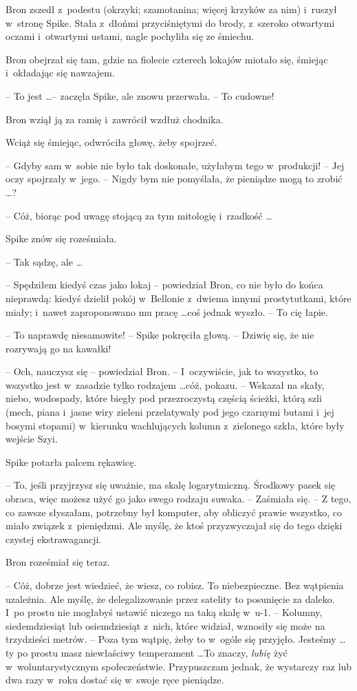 \documentclass[oneside,polish,11pt,rmheadings]{mwbk}
\begin{document}
Bron zszedł z~podestu (okrzyki; szamotanina; więcej krzyków za nim) i~ruszył w~stronę Spike. Stała z~dłońmi przyciśniętymi do brody, z~szeroko otwartymi oczami i~otwartymi ustami, nagle pochyliła się ze śmiechu. 

Bron obejrzał się tam, gdzie na fiolecie czterech lokajów miotało się, śmiejąc i~okładając się nawzajem. 

-- To jest \ldots  -- zaczęła Spike, ale znowu przerwała. -- To cudowne! 

Bron wziął ją za ramię i~zawrócił wzdłuż chodnika. 

Wciąż się śmiejąc, odwróciła głowę, żeby spojrzeć.

-- Gdyby sam w~sobie nie było tak doskonałe, użyłabym tego w~produkcji! -- Jej oczy spojrzały w~jego. -- Nigdy bym nie pomyślała, że pieniądze mogą to zrobić \ldots ? 

-- Cóż, biorąc pod uwagę stojącą za tym mitologię i~rzadkość \ldots  

Spike znów się roześmiała. 

-- Tak sądzę, ale \ldots  

-- Spędziłem kiedyś czas jako lokaj -- powiedział Bron, co nie było do końca nieprawdą: kiedyś dzielił pokój w~Bellonie z~dwiema innymi prostytutkami, które miały; i~nawet zaproponowano mu pracę \ldots  coś jednak wyszło. -- To cię łapie. 

-- To naprawdę niesamowite! -- Spike pokręciła głową. -- Dziwię się, że nie rozrywają go na kawałki! 

-- Och, nauczysz się -- powiedział Bron. -- I~oczywiście, jak to wszystko, to wszystko jest w~zasadzie tylko rodzajem \ldots  cóż, pokazu. -- Wskazał na skały, niebo, wodospady, które biegły pod przezroczystą częścią ścieżki, którą szli (mech, piana i~jasne wiry zieleni przelatywały pod jego czarnymi butami i~jej bosymi stopami) w~kierunku wachlujących kolumn z~zielonego szkła, które były wejście Szyi. 

Spike potarła palcem rękawicę. 

-- To, jeśli przyjrzysz się uważnie, ma skalę logarytmiczną. Środkowy pasek się obraca, więc możesz użyć go jako swego rodzaju suwaka. -- Zaśmiała się. -- Z tego, co zawsze słyszałam, potrzebny był komputer, aby obliczyć prawie wszystko, co miało związek z~pieniędzmi. Ale myślę, że ktoś przyzwyczajał się do tego dzięki czystej ekstrawagancji. 

Bron roześmiał się teraz. 

-- Cóż, dobrze jest wiedzieć, że wiesz, co robisz. To niebezpieczne. Bez wątpienia uzależnia. Ale myślę, że delegalizowanie przez satelity to posunięcie za daleko. I~po prostu nie mogłabyś ustawić niczego na taką skalę w~u-1. -- Kolumny, siedemdziesiąt lub osiemdziesiąt z~nich, które widział, wznosiły się może na trzydzieści metrów. -- Poza tym wątpię, żeby to w~ogóle się przyjęło. Jesteśmy \ldots  ty po prostu masz niewłaściwy temperament \ldots  To znaczy, \textit{lubię }żyć w~woluntarystycznym społeczeństwie. Przypuszczam jednak, że wystarczy raz lub dwa razy w~roku dostać się w~swoje ręce pieniądze. 
\end{document}

